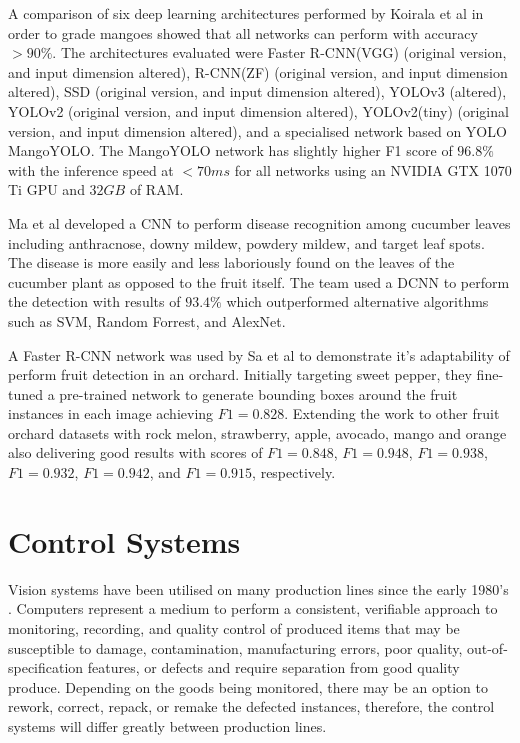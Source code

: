 \documentclass[fleqn,twoside,12pt]{report}
\begin{document}
A comparison of six deep learning architectures performed by Koirala et al \cite{koirala} in order to grade mangoes showed that all networks can perform with accuracy $>90\%$. The architectures evaluated were Faster R-CNN(VGG) (original version, and input dimension altered), R-CNN(ZF) (original version, and input dimension altered), SSD (original version, and input dimension altered), YOLOv3 (altered), YOLOv2 (original version, and input dimension altered), YOLOv2(tiny) (original version, and input dimension altered), and a specialised network based on YOLO MangoYOLO. The MangoYOLO network has slightly higher F1 score of $96.8\%$ with the inference speed at $<70ms$ for all networks using an NVIDIA GTX 1070 Ti GPU and $32GB$ of RAM.

Ma et al \cite{ma} developed a CNN to perform disease recognition among cucumber leaves including anthracnose, downy mildew, powdery mildew, and target leaf spots. The disease is more easily and less laboriously found on the leaves of the cucumber plant as opposed to the fruit itself. The team used a DCNN to perform the detection with results of $93.4\%$ which outperformed alternative algorithms such as SVM, Random Forrest, and AlexNet.

   
A Faster R-CNN network was used by Sa et al \cite{sa} to demonstrate it's adaptability of perform fruit detection in an orchard. Initially targeting sweet pepper, they fine-tuned a pre-trained network to generate bounding boxes around the fruit instances in each image achieving $F1=0.828$. Extending the work to other fruit orchard datasets with rock melon, strawberry, apple, avocado, mango and orange also delivering good results with scores of $F1=0.848$, $F1=0.948$, $F1=0.938$, $F1=0.932$, $F1=0.942$, and $F1=0.915$, respectively. 




\section{Control Systems}
\label{sec:control_sys}

Vision systems have been utilised on many production lines since the early 1980's \cite{kruger}. Computers represent a medium to perform a consistent, verifiable approach to monitoring, recording, and quality control of produced items that may be susceptible to damage, contamination, manufacturing errors, poor quality, out-of-specification features, or defects and require separation from good quality produce. Depending on the goods being monitored, there may be an option to rework, correct, repack, or remake the defected instances, therefore, the control systems will differ greatly between production lines.   
\end{document}
